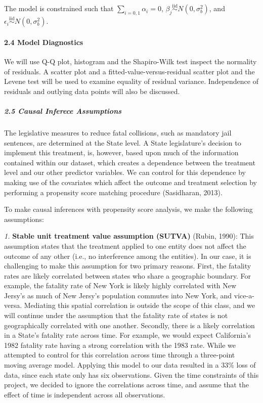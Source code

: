 \documentclass[]{article}
\let\oldparagraph\paragraph
\renewcommand{\paragraph}[1]{\oldparagraph{#1}\mbox{}}
\let\oldsubparagraph\subparagraph
\renewcommand{\subparagraph}[1]{\oldsubparagraph{#1}\mbox{}}
\begin{document}
The model is constrained such that
\(\displaystyle\sum\limits_{i = 0, 1}\alpha_i = 0\),
\(\beta_j \overset{\text{iid}}\sim N(0, \sigma^2_b)\), and
\(\epsilon_i \overset{\text{iid}}\sim N(0, \sigma^2_b)\).

\hypertarget{model-diagnostics}{%
\paragraph{2.4 Model Diagnostics}\label{model-diagnostics}}

We will use Q-Q plot, histogram and the Shapiro-Wilk test inspect the
normality of residuals. A scatter plot and a
fitted-value-versus-residual scatter plot and the Levene test will be
used to examine equality of residual variance. Independence of residuals
and outlying data points will also be discussed.

\hypertarget{causal-inferece-assumptions}{%
\subparagraph{2.5 Causal Inferece
Assumptions}\label{causal-inferece-assumptions}}

The legislative measures to reduce fatal collisions, such as mandatory
jail sentences, are determined at the State level. A State legislature's
decision to implement this treatment, is, however, based upon much of
the information contained within our dataset, which creates a dependence
between the treatment level and our other predictor variables. We can
control for this dependence by making use of the covariates which affect
the outcome and treatment selection by performing a propensity score
matching procedure (Sasidharan, 2013).

To make causal inferences with propensity score analysis, we make the
following assumptions:

\emph{1.} \textbf{Stable unit treatment value assumption (SUTVA)}
(Rubin, 1990): This assumption states that the treatment applied to one
entity does not affect the outcome of any other (i.e., no interference
among the entities). In our case, it is challenging to make this
assumption for two primary reasons. First, the fatality rates are likely
correlated between states who share a geographic boundary. For example,
the fatality rate of New York is likely highly correlated with New
Jersy's as much of New Jersy's population commutes into New York, and
vice-a-versa. Mediating this spatial correlation is outside the scope of
this class, and we will continue under the assumption that the fatality
rate of states is not geographically correlated with one another.
Secondly, there is a likely correlation in a State's fatality rate
across time. For example, we would expect California's 1982 fatality
rate having a strong correlation with the 1983 rate. While we attempted
to control for this correlation across time through a three-point moving
average model. Applying this model to our data resulted in a 33\% loss
of data, since each state only has six observations. Given the time
constraints of this project, we decided to ignore the correlations
across time, and assume that the effect of time is independent across
all observations.
\end{document}
